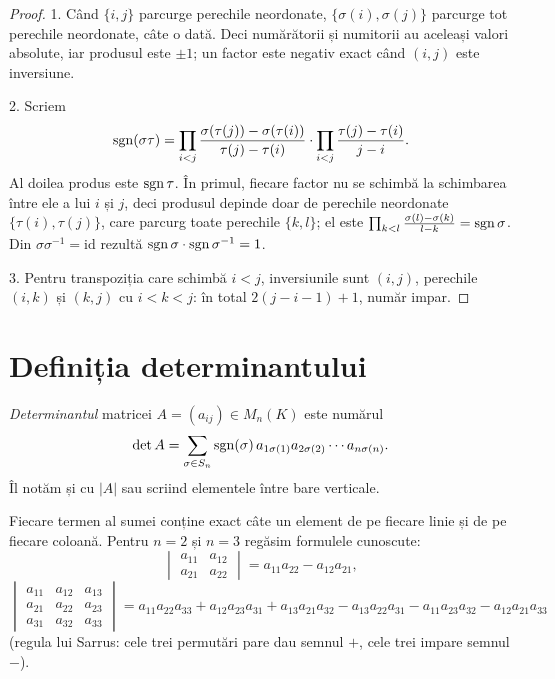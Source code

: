\begin{proof}
1. Când $\{i,j\}$ parcurge perechile neordonate, $\{\sigma(i),\sigma(j)\}$ parcurge tot perechile neordonate, câte o dată. Deci numărătorii și numitorii au aceleași valori absolute, iar produsul este $\pm1$; un factor este negativ exact când $(i,j)$ este inversiune.

2. Scriem
\[
\operatorname{sgn}(\sigma\tau)=\prod_{i<j}\frac{\sigma(\tau(j))-\sigma(\tau(i))}{\tau(j)-\tau(i)}\cdot\prod_{i<j}\frac{\tau(j)-\tau(i)}{j-i}.
\]
Al doilea produs este $\operatorname{sgn}\tau$. În primul, fiecare factor nu se schimbă la schimbarea între ele a lui $i$ și $j$, deci produsul depinde doar de perechile neordonate $\{\tau(i),\tau(j)\}$, care parcurg toate perechile $\{k,l\}$; el este $\prod_{k<l}\frac{\sigma(l)-\sigma(k)}{l-k}=\operatorname{sgn}\sigma$. Din $\sigma\sigma^{-1}=\mathrm{id}$ rezultă $\operatorname{sgn}\sigma\cdot\operatorname{sgn}\sigma^{-1}=1$.

3. Pentru transpoziția care schimbă $i<j$, inversiunile sunt $(i,j)$, perechile $(i,k)$ și $(k,j)$ cu $i<k<j$: în total $2(j-i-1)+1$, număr impar.
\end{proof}

\section{Definiția determinantului}

\begin{definitie}\label{def:det}
\emph{Determinantul} matricei $A=(a_{ij})\in M_n(K)$ este numărul
\[
\det A=\sum_{\sigma\in S_n}\operatorname{sgn}(\sigma)\,a_{1\sigma(1)}a_{2\sigma(2)}\cdots a_{n\sigma(n)} .
\]
Îl notăm și cu $|A|$ sau scriind elementele între bare verticale.
\end{definitie}

Fiecare termen al sumei conține exact câte un element de pe fiecare linie și de pe fiecare coloană. Pentru $n=2$ și $n=3$ regăsim formulele cunoscute:
\[
\begin{vmatrix} a_{11}&a_{12}\\ a_{21}&a_{22}\end{vmatrix}=a_{11}a_{22}-a_{12}a_{21},
\]
\[
\begin{vmatrix} a_{11}&a_{12}&a_{13}\\ a_{21}&a_{22}&a_{23}\\ a_{31}&a_{32}&a_{33}\end{vmatrix}
=a_{11}a_{22}a_{33}+a_{12}a_{23}a_{31}+a_{13}a_{21}a_{32}-a_{13}a_{22}a_{31}-a_{11}a_{23}a_{32}-a_{12}a_{21}a_{33}
\]
(regula lui Sarrus: cele trei permutări pare dau semnul $+$, cele trei impare semnul $-$).

